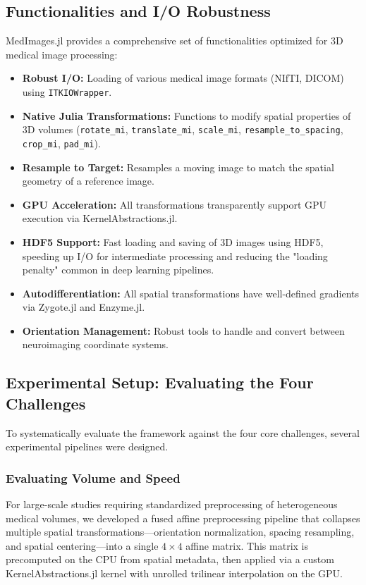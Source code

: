 \documentclass[10pt,letterpaper]{article}
\begin{document}
\subsection*{Functionalities and I/O Robustness}
MedImages.jl provides a comprehensive set of functionalities optimized for 3D medical image processing:
\begin{itemize}
    \item \textbf{Robust I/O:} Loading of various medical image formats (NIfTI, DICOM) using \texttt{ITKIOWrapper}.
    \item \textbf{Native Julia Transformations:} Functions to modify spatial properties of 3D volumes (\texttt{rotate\_mi}, \texttt{translate\_mi}, \texttt{scale\_mi}, \texttt{resample\_to\_spacing}, \texttt{crop\_mi}, \texttt{pad\_mi}).
    \item \textbf{Resample to Target:} Resamples a moving image to match the spatial geometry of a reference image.
    \item \textbf{GPU Acceleration:} All transformations transparently support GPU execution via KernelAbstractions.jl.
    \item \textbf{HDF5 Support:} Fast loading and saving of 3D images using HDF5, speeding up I/O for intermediate processing and reducing the "loading penalty" common in deep learning pipelines.
    \item \textbf{Autodifferentiation:} All spatial transformations have well-defined gradients via Zygote.jl and Enzyme.jl.
    \item \textbf{Orientation Management:} Robust tools to handle and convert between neuroimaging coordinate systems.
\end{itemize}

\subsection*{Experimental Setup: Evaluating the Four Challenges}
To systematically evaluate the framework against the four core challenges, several experimental pipelines were designed.

\subsubsection*{Evaluating Volume and Speed}
For large-scale studies requiring standardized preprocessing of heterogeneous medical volumes, we developed a fused affine preprocessing pipeline that collapses multiple spatial transformations---orientation normalization, spacing resampling, and spatial centering---into a single $4 \times 4$ affine matrix. This matrix is precomputed on the CPU from spatial metadata, then applied via a custom KernelAbstractions.jl kernel with unrolled trilinear interpolation on the GPU.
\end{document}
